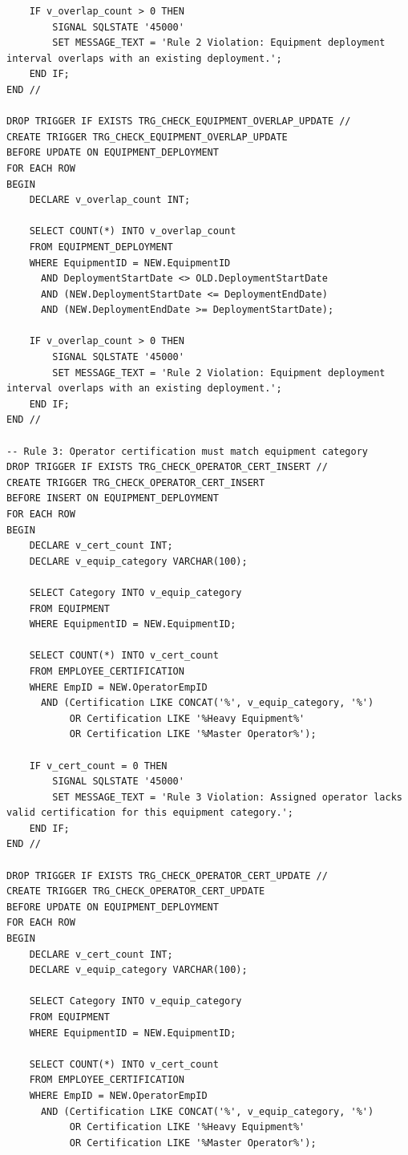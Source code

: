 \documentclass[a4paper,12pt]{report}
\begin{document}
\begin{lstlisting}
    IF v_overlap_count > 0 THEN
        SIGNAL SQLSTATE '45000'
        SET MESSAGE_TEXT = 'Rule 2 Violation: Equipment deployment interval overlaps with an existing deployment.';
    END IF;
END //

DROP TRIGGER IF EXISTS TRG_CHECK_EQUIPMENT_OVERLAP_UPDATE //
CREATE TRIGGER TRG_CHECK_EQUIPMENT_OVERLAP_UPDATE
BEFORE UPDATE ON EQUIPMENT_DEPLOYMENT
FOR EACH ROW
BEGIN
    DECLARE v_overlap_count INT;

    SELECT COUNT(*) INTO v_overlap_count
    FROM EQUIPMENT_DEPLOYMENT
    WHERE EquipmentID = NEW.EquipmentID
      AND DeploymentStartDate <> OLD.DeploymentStartDate
      AND (NEW.DeploymentStartDate <= DeploymentEndDate)
      AND (NEW.DeploymentEndDate >= DeploymentStartDate);

    IF v_overlap_count > 0 THEN
        SIGNAL SQLSTATE '45000'
        SET MESSAGE_TEXT = 'Rule 2 Violation: Equipment deployment interval overlaps with an existing deployment.';
    END IF;
END //

-- Rule 3: Operator certification must match equipment category
DROP TRIGGER IF EXISTS TRG_CHECK_OPERATOR_CERT_INSERT //
CREATE TRIGGER TRG_CHECK_OPERATOR_CERT_INSERT
BEFORE INSERT ON EQUIPMENT_DEPLOYMENT
FOR EACH ROW
BEGIN
    DECLARE v_cert_count INT;
    DECLARE v_equip_category VARCHAR(100);

    SELECT Category INTO v_equip_category
    FROM EQUIPMENT
    WHERE EquipmentID = NEW.EquipmentID;

    SELECT COUNT(*) INTO v_cert_count
    FROM EMPLOYEE_CERTIFICATION
    WHERE EmpID = NEW.OperatorEmpID
      AND (Certification LIKE CONCAT('%', v_equip_category, '%') 
           OR Certification LIKE '%Heavy Equipment%' 
           OR Certification LIKE '%Master Operator%');

    IF v_cert_count = 0 THEN
        SIGNAL SQLSTATE '45000'
        SET MESSAGE_TEXT = 'Rule 3 Violation: Assigned operator lacks valid certification for this equipment category.';
    END IF;
END //

DROP TRIGGER IF EXISTS TRG_CHECK_OPERATOR_CERT_UPDATE //
CREATE TRIGGER TRG_CHECK_OPERATOR_CERT_UPDATE
BEFORE UPDATE ON EQUIPMENT_DEPLOYMENT
FOR EACH ROW
BEGIN
    DECLARE v_cert_count INT;
    DECLARE v_equip_category VARCHAR(100);

    SELECT Category INTO v_equip_category
    FROM EQUIPMENT
    WHERE EquipmentID = NEW.EquipmentID;

    SELECT COUNT(*) INTO v_cert_count
    FROM EMPLOYEE_CERTIFICATION
    WHERE EmpID = NEW.OperatorEmpID
      AND (Certification LIKE CONCAT('%', v_equip_category, '%') 
           OR Certification LIKE '%Heavy Equipment%' 
           OR Certification LIKE '%Master Operator%');


\end{lstlisting}
\end{document}
